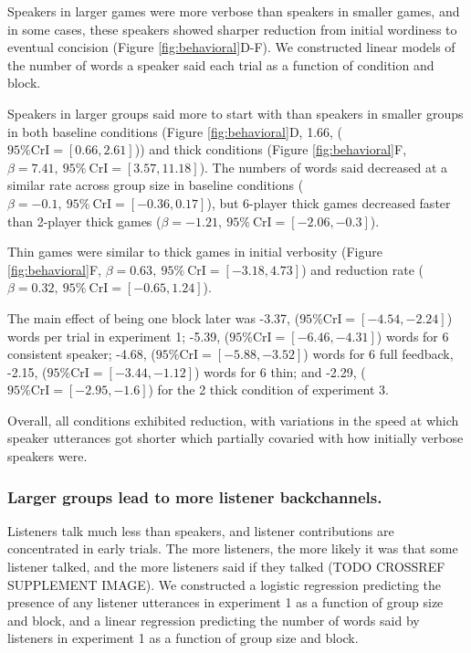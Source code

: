 \documentclass[
  english,
  a4paper,
]{article}
\begin{document}
Speakers in larger games were more verbose than speakers in smaller games, and in some cases, these speakers showed sharper reduction from initial wordiness to eventual concision (Figure \ref{fig:behavioral}D-F). We constructed linear models of the number of words a speaker said each trial as a function of condition and block.

Speakers in larger groups said more to start with than speakers in smaller groups in both baseline conditions (Figure \ref{fig:behavioral}D, 1.66, (\(95\%\mathrm{CrI}=[0.66, 2.61]\))) and thick conditions (Figure \ref{fig:behavioral}F, \(\beta=7.41,\:95\%\:\mathrm{CrI}=[3.57, 11.18]\)). The numbers of words said decreased at a similar rate across group size in baseline conditions (\(\beta=-0.1,\:95\%\:\mathrm{CrI}=[-0.36, 0.17]\)), but 6-player thick games decreased faster than 2-player thick games (\(\beta=-1.21,\:95\%\:\mathrm{CrI}=[-2.06, -0.3]\)).

Thin games were similar to thick games in initial verbosity (Figure \ref{fig:behavioral}F, \(\beta=0.63,\:95\%\:\mathrm{CrI}=[-3.18, 4.73]\)) and reduction rate ( \(\beta=0.32,\:95\%\:\mathrm{CrI}=[-0.65, 1.24]\)).

The main effect of being one block later was -3.37, (\(95\%\mathrm{CrI}=[-4.54, -2.24]\)) words per trial in experiment 1; -5.39, (\(95\%\mathrm{CrI}=[-6.46, -4.31]\)) words for 6 consistent speaker; -4.68, (\(95\%\mathrm{CrI}=[-5.88, -3.52]\)) words for 6 full feedback, -2.15, (\(95\%\mathrm{CrI}=[-3.44, -1.12]\)) words for 6 thin; and -2.29, (\(95\%\mathrm{CrI}=[-2.95, -1.6]\)) for the 2 thick condition of experiment 3.

Overall, all conditions exhibited reduction, with variations in the speed at which speaker utterances got shorter which partially covaried with how initially verbose speakers were.

\hypertarget{larger-groups-lead-to-more-listener-backchannels.}{%
\subsubsection{Larger groups lead to more listener backchannels.}\label{larger-groups-lead-to-more-listener-backchannels.}}

Listeners talk much less than speakers, and listener contributions are concentrated in early trials. The more listeners, the more likely it was that some listener talked, and the more listeners said if they talked (TODO CROSSREF SUPPLEMENT IMAGE). We constructed a logistic regression predicting the presence of any listener utterances in experiment 1 as a function of group size and block, and a linear regression predicting the number of words said by listeners in experiment 1 as a function of group size and block.
\end{document}
